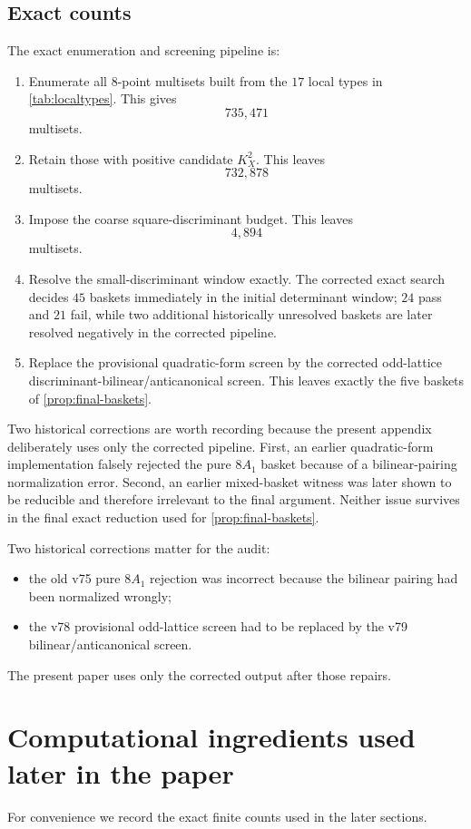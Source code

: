 \documentclass[11pt]{article}
\theoremstyle{definition}
\begin{document}
\subsection{Exact counts}
The exact enumeration and screening pipeline is:
\begin{enumerate}[label=\textup{(\arabic*)}]
\item Enumerate all $8$-point multisets built from the $17$ local types in \cref{tab:localtypes}. This gives
\[
735{,}471
\]
multisets.
\item Retain those with positive candidate $K_X^2$. This leaves
\[
732{,}878
\]
multisets.
\item Impose the coarse square-discriminant budget. This leaves
\[
4{,}894
\]
multisets.
\item Resolve the small-discriminant window exactly. The corrected exact search decides $45$ baskets immediately in the initial determinant window; $24$ pass and $21$ fail, while two additional historically unresolved baskets are later resolved negatively in the corrected pipeline.
\item Replace the provisional quadratic-form screen by the corrected odd-lattice discriminant-bilinear/anticanonical screen. This leaves exactly the five baskets of \cref{prop:final-baskets}.
\end{enumerate}

Two historical corrections are worth recording because the present appendix deliberately uses only the corrected pipeline. First, an earlier quadratic-form implementation falsely rejected the pure $8A_1$ basket because of a bilinear-pairing normalization error. Second, an earlier mixed-basket witness was later shown to be reducible and therefore irrelevant to the final argument. Neither issue survives in the final exact reduction used for \cref{prop:final-baskets}.

Two historical corrections matter for the audit:
\begin{itemize}
\item the old v75 pure $8A_1$ rejection was incorrect because the bilinear pairing had been normalized wrongly;
\item the v78 provisional odd-lattice screen had to be replaced by the v79 bilinear/anticanonical screen.
\end{itemize}
The present paper uses only the corrected output after those repairs.

\section{Computational ingredients used later in the paper}\label{app:later-computations}
For convenience we record the exact finite counts used in the later sections.
\end{document}
